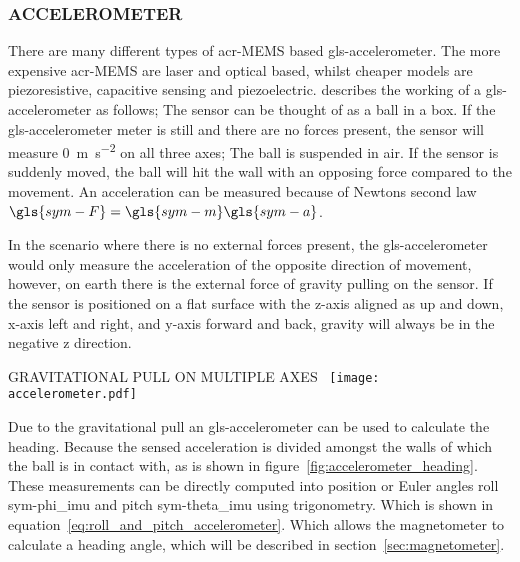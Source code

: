 \newpage

\subsubsection{ACCELEROMETER}

There are many different types of \gls{acr-MEMS} based \gls{gls-accelerometer}. The more expensive \gls{acr-MEMS} are
laser and optical based, whilst cheaper models are piezoresistive, capacitive sensing and piezoelectric.
\citet{leccadito_kalman_2013} describes the working of a \gls{gls-accelerometer} as follows; The sensor can be
thought of as a ball in a box. If the \gls{gls-accelerometer} meter is still and there are no forces present, the
sensor will measure \SI{0}{\meter\per\second\squared} on all three axes; The ball is suspended in air. If the sensor
is suddenly moved, the ball will hit the wall with an opposing force compared to the movement. An acceleration can be
measured because of Newtons second law \( \gls{sym-F} = \gls{sym-m}  \gls{sym-a}  \).

In the scenario where there is no external forces present, the \gls{gls-accelerometer} would only measure the
acceleration of the opposite direction of movement, however, on earth there is the external force of gravity pulling on
the sensor. If the sensor is positioned on a flat surface with the z-axis aligned as up and down, x-axis left and right,
and y-axis forward and back, gravity will always be in the negative z direction.

\begin{RoyalFigure}[!htb, label=fig:accelerometer_heading]{GRAVITATIONAL PULL ON MULTIPLE
AXES~\cite{leccadito_kalman_2013}}
    \texttt{[image: accelerometer.pdf]}
\end{RoyalFigure}

Due to the gravitational pull an \gls{gls-accelerometer} can be used to calculate the heading. Because the sensed
acceleration is divided amongst the walls of which the ball is in contact with, as is shown in
figure~\ref{fig:accelerometer_heading}. These measurements can be directly computed into position or Euler angles roll
\gls{sym-phi_imu}  and pitch \gls{sym-theta_imu} using trigonometry. Which is shown in
equation~\ref{eq:roll_and_pitch_accelerometer}. Which allows the magnetometer to calculate a heading angle, which will
be described in section~\ref{sec:magnetometer}.


